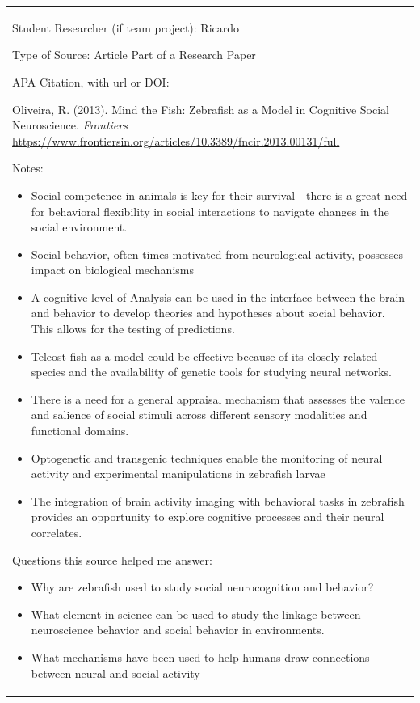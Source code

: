 \begin{longtable}[]{@{}
  >{\raggedright\arraybackslash}p{}@{}}
\toprule\noalign{}

Student Researcher (if team project): Ricardo


Type of Source: Article Part of a Research Paper


APA Citation, with url or DOI:

Oliveira, R. (2013). Mind the Fish: Zebrafish as a Model in Cognitive
Social Neuroscience. \emph{Frontiers}
\href{https://www.frontiersin.org/articles/10.3389/fncir.2013.00131/full}{https://www.frontiersin.org/articles/10.3389/fncir.2013.00131/full}


Notes:

\begin{itemize}
\item
  Social competence in animals is key for their survival - there is a
  great need for behavioral flexibility in social interactions to
  navigate changes in the social environment.
\item
  Social behavior, often times motivated from neurological activity,
  possesses impact on biological mechanisms
\item
  A cognitive level of Analysis can be used in the interface between the
  brain and behavior to develop theories and hypotheses about social
  behavior. This allows for the testing of predictions.
\item
  Teleost fish as a model could be effective because of its closely
  related species and the availability of genetic tools for studying
  neural networks.
\item
  There is a need for a general appraisal mechanism that assesses the
  valence and salience of social stimuli across different sensory
  modalities and functional domains.
\item
  Optogenetic and transgenic techniques enable the monitoring of neural
  activity and experimental manipulations in zebrafish larvae
\item
  The integration of brain activity imaging with behavioral tasks in
  zebrafish provides an opportunity to explore cognitive processes and
  their neural correlates.
\end{itemize}


Questions this source helped me answer:

\begin{itemize}
\item
  Why are zebrafish used to study social neurocognition and behavior?
\item
  What element in science can be used to study the linkage between
  neuroscience behavior and social behavior in environments.
\item
  What mechanisms have been used to help humans draw connections between
  neural and social activity
\end{itemize}



\end{longtable}

